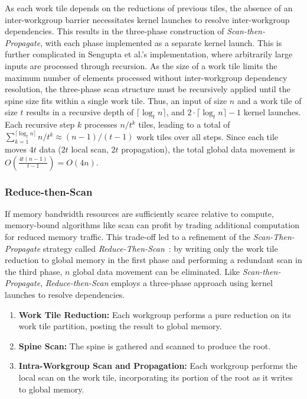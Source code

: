 \documentclass[sigconf]{acmart}
\begin{document}
As each work tile depends on the reductions of previous tiles, the absence of an inter-workgroup barrier necessitates kernel launches to resolve inter-workgroup dependencies. This results in the three-phase construction of \emph{Scan-then-Propagate}, with each phase implemented as a separate kernel launch. This is further complicated in Sengupta et al.'s implementation, where arbitrarily large inputs are processed through recursion. As the size of a work tile limits the maximum number of elements processed without inter-workgroup dependency resolution, the three-phase scan structure must be recursively applied until the spine size fits within a single work tile. Thus, an input of size $n$ and a work tile of size $t$ results in a recursive depth of $\lceil \log_t n \rceil$, and $2\cdot\lceil \log_t n \rceil - 1$ kernel launches. Each recursive step $k$ processes $n/t^k$ tiles, leading to a total of $\sum_{k=1}^{\lceil \log_t n \rceil} n/t^k \approx (n - 1)/(t - 1)$ work tiles over all steps. Since each tile moves $4t$ data ($2t$ local scan, $2t$ propagation), the total global data movement is $O\left(\frac{4t(n - 1)}{t - 1}\right) = O(4n)$.

\subsubsection{Reduce-then-Scan}
If memory bandwidth resources are sufficiently scarce relative to compute, memory-bound algorithms like scan can profit by trading additional computation for reduced memory traffic. This trade-off led to a refinement of the \emph{Scan-Then-Propagate} strategy called \emph{Reduce-Then-Scan}~\cite{10.1145/1375527.1375559, Merrill2009, 10.1109/TPDS.2012.336, 10.5555/2031978.2032029}: by writing only the work tile reduction to global memory in the first phase and performing a redundant scan in the third phase, $n$ global data movement can be eliminated. Like \emph{Scan-then-Propagate}, \emph{Reduce-then-Scan} employs a three-phase approach using kernel launches to resolve dependencies.
\begin{enumerate}
  \item \textbf{Work Tile Reduction:} Each workgroup performs a pure reduction on its work tile partition, posting the result to global memory.
  \item \textbf{Spine Scan:} The spine is gathered and scanned to produce the root.
  \item \textbf{Intra-Workgroup Scan and Propagation:} Each workgroup performs the local scan on the work tile, incorporating its portion of the root as it writes to global memory.
\end{enumerate}
\end{document}
